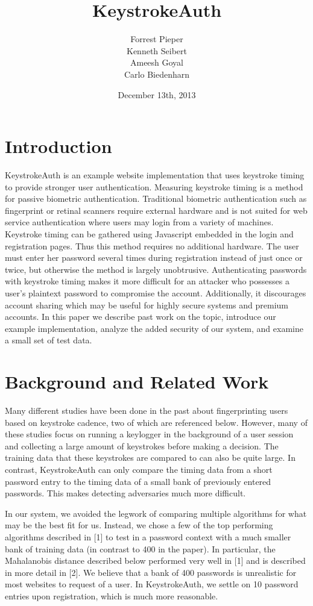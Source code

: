 \documentclass{article}
\title{KeystrokeAuth}
\author{
  Forrest Pieper\\
  Kenneth Seibert\\
  Ameesh Goyal\\
  Carlo Biedenharn
}
\date{December 13th, 2013}
\begin{document}
\maketitle

\section{Introduction}
\label{introduction}
KeystrokeAuth is an example website implementation that uses keystroke timing to provide stronger user authentication.
Measuring keystroke timing is a method for passive biometric authentication. 
Traditional biometric authentication such as fingerprint or retinal scanners require external hardware and is not suited for web service authentication where users may login from a variety of machines. 
Keystroke timing can be gathered using Javascript embedded in the login and registration pages.
Thus this method requires no additional hardware.
The user must enter her password several times during registration instead of just once or twice, but otherwise the method is largely unobtrusive.
Authenticating passwords with keystroke timing makes it more difficult for an attacker who possesses a user's plaintext password to compromise the account.
Additionally, it discourages account sharing which may be useful for highly secure systems and premium accounts.
In this paper we describe past work on the topic, introduce our example implementation, analyze the added security of our system, and examine a small set of test data.

\section{Background and Related Work}

Many different studies have been done in the past about fingerprinting users based on keystroke cadence, two of which are referenced below. However, many of these studies focus on running a keylogger in the background of a user session and collecting a large amount of keystrokes before making a decision. The training data that these keystrokes are compared to can also be quite large. In contrast, KeystrokeAuth can only compare the timing data from a short password entry to the timing data of a small bank of previously entered passwords. This makes detecting adversaries much more difficult.

In our system, we avoided the legwork of comparing multiple algorithms for what may be the best fit for us. Instead, we chose a few of the top performing algorithms described in {[}1{]} to test in a password context with a much smaller bank of training data (in contrast to 400 in the paper). In particular, the Mahalanobis distance described below performed very well in {[}1{]} and is described in more detail in {[}2{]}. We believe that a bank of 400 passwords is unrealistic for most websites to request of a user. In KeystrokeAuth, we settle on 10 password entries upon registration, which is much more reasonable. 
\end{document}
